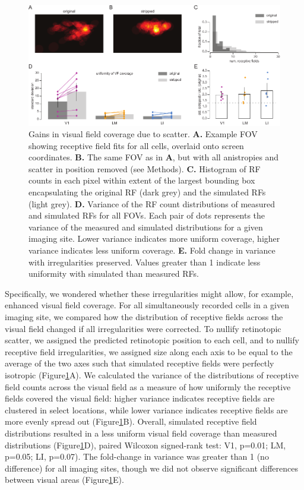 \begin{figure}[t!]
    \includegraphics[width=\textwidth]{figures/chapter_3/fig_3-6_vf_coverage/fig_3-6_vf_coverage.pdf}
    \vspace{.1in}
    \caption[Compensatory visual field coverage]{Gains in visual field coverage due to scatter. 
    \textbf{A.} Example FOV showing receptive field fits for all cells, overlaid onto screen coordinates.
    \textbf{B.} The same FOV as in \textbf{A}, but with all anistropies and scatter in position removed (see Methods). 
    \textbf{C.} Histogram of RF counts in each pixel within extent of the largest bounding box encapsulating the original RF (dark grey) and the simulated RFs (light grey).
    \textbf{D.} Variance of the RF count distributions of measured and simulated RFs for all FOVs. Each pair of dots represents the variance of the measured and simulated distributions for a given imaging site. Lower variance indicates more uniform coverage, higher variance indicates less uniform coverage.
    \textbf{E.} Fold change in variance with irregularities preserved. Values greater than 1 indicate less uniformity with simulated than measured RFs.
    \label{fig:vf_coverage}}
\end{figure}

Specifically, we wondered whether these irregularities might allow, for example, enhanced visual field coverage. For all simultaneously recorded cells in a given imaging site, we compared how the distribution of receptive fields across the visual field changed if all irregularities were corrected. To nullify retinotopic scatter, we assigned the predicted retinotopic position to each cell, and to nullify receptive field irregularities, we assigned size along each axis to be equal to the average of the two axes such that simulated receptive fields were perfectly isotropic (Figure\ref{fig:vf_coverage}A). We calculated the variance of the distributions of receptive field counts across the visual field as a measure of how uniformly the receptive fields covered the visual field:  higher variance indicates receptive fields are clustered in select locations, while lower variance indicates receptive fields are more evenly spread out (Figure\ref{fig:vf_coverage}B). Overall, simulated receptive field distributions resulted in a less uniform visual field coverage than measured distributions (Figure\ref{fig:vf_coverage}D), paired Wilcoxon signed-rank test: V1, p=0.01; LM, p=0.05; LI, p=0.07). The fold-change in variance was greater than 1 (no difference) for all imaging sites, though we did not observe significant differences between visual areas (Figure\ref{fig:vf_coverage}E). 

